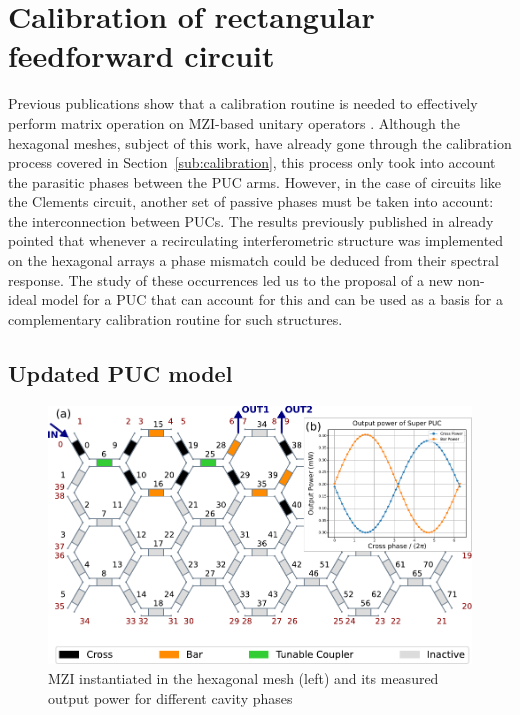 \section{Calibration of rectangular feedforward circuit}\label{sec:ff_calibration} %

Previous publications show that a calibration routine is needed to effectively perform matrix operation on MZI-based unitary operators \cite{alexiev_calibrating_2021}.
Although the hexagonal meshes, subject of this work, have already gone through the calibration process covered in Section~\ref{sub:calibration}, this process only took into account the parasitic phases between the PUC arms.
However, in the case of circuits like the Clements circuit, another set of passive phases must be taken into account: the interconnection between PUCs.
The results previously published in \cite{perez-lopez_general-purpose_2024, on_programmable_2024} already pointed that whenever a recirculating interferometric structure was implemented on the hexagonal arrays a phase mismatch could be deduced from their spectral response.
The study of these occurrences led us to the proposal of a new non-ideal model for a PUC that can account for this and can be used as a basis for a complementary calibration routine for such structures.

\subsection{Updated PUC model}\label{sub:updated_puc_model} %

\begin{figure}[t]
	\begin{center}
		\includegraphics{figures/ch4-superpuc.pdf}
	\end{center}
	\caption{MZI instantiated in the hexagonal mesh (left) and its measured output power for different cavity
		phases}\label{fig:ch4-superpuc}
\end{figure}

